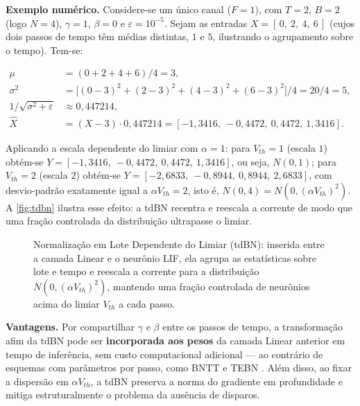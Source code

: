 				\par \textbf{Exemplo numérico.} Considere-se um único canal ($F=1$), com $T=2$, $B=2$ (logo $N=4$), $\gamma=1$, $\beta=0$ e $\varepsilon=10^{-5}$. Sejam as entradas $X = [\,0,\ 2,\ 4,\ 6\,]$ (cujos dois passos de tempo têm médias distintas, $1$ e $5$, ilustrando o agrupamento sobre o tempo). Tem-se:

				\begin{equation}
					\begin{aligned}
						\mu &= (0+2+4+6)/4 = 3, \\
						\sigma^2 &= \big[(0-3)^2+(2-3)^2+(4-3)^2+(6-3)^2\big]/4 = 20/4 = 5, \\
						1/\sqrt{\sigma^2+\varepsilon} &\approx 0{,}447214, \\
						\hat{X} &= (X-3)\cdot 0{,}447214 = [-1{,}3416,\ -0{,}4472,\ 0{,}4472,\ 1{,}3416].
					\end{aligned}
				\end{equation}

				\par Aplicando a escala dependente do limiar com $\alpha=1$: para $V_{th}=1$ (escala $1$) obtém-se $Y=[-1{,}3416,\ -0{,}4472,\ 0{,}4472,\ 1{,}3416]$, ou seja, $N(0,1)$; para $V_{th}=2$ (escala $2$) obtém-se $Y=[-2{,}6833,\ -0{,}8944,\ 0{,}8944,\ 2{,}6833]$, com desvio-padrão exatamente igual a $\alpha V_{th}=2$, isto é, $N(0,4)=N(0,(\alpha V_{th})^2)$. A \autoref{fig:tdbn} ilustra esse efeito: a tdBN recentra e reescala a corrente de modo que uma fração controlada da distribuição ultrapasse o limiar.

				\begin{figure}[h]
					\centering
					\caption[Normalização em Lote Dependente do Limiar (tdBN)]{Normalização em Lote Dependente do Limiar (tdBN): inserida entre a camada Linear e o neurônio LIF, ela agrupa as estatísticas sobre lote e tempo e reescala a corrente para a distribuição $N(0,(\alpha V_{th})^2)$, mantendo uma fração controlada de neurônios acima do limiar $V_{th}$ a cada passo.}
					\resizebox{0.85\linewidth}{!}{}
					\label{fig:tdbn}
				\end{figure}

				\par \textbf{Vantagens.} Por compartilhar $\gamma$ e $\beta$ entre os passos de tempo, a transformação afim da tdBN pode ser \textbf{incorporada aos pesos} da camada Linear anterior em tempo de inferência, sem custo computacional adicional --- ao contrário de esquemas com parâmetros por passo, como BNTT \cite{kim2021bntt} e TEBN \cite{duan2022tebn} \cite{zheng2021goingdeeper}. Além disso, ao fixar a dispersão em $\alpha V_{th}$, a tdBN preserva a norma do gradiente em profundidade e mitiga estruturalmente o problema da ausência de disparos.

